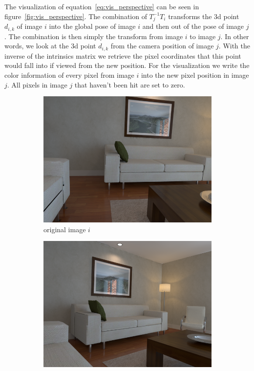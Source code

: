         The visualization of equation~\ref{eq:vis_perspective} can be seen in figure~\ref{fig:vis_perspective}.
        The combination of $T_j^{-1}T_i$ transforms the 3d point $d_{i,k}$ of image $i$ into the global pose of image $i$ and then out of the pose of image $j$.
        The combination is then simply the transform from image $i$ to image $j$.
        In other words, we look at the 3d point $d_{i,k}$ from the camera position of image $j$.
        With the inverse of the intrinsics matrix we retrieve the pixel coordinates that this point would fall into if viewed from the new position.
        For the visualization we write the color information of every pixel from image $i$ into the new pixel position in image $j$.
        All pixels in image $j$ that haven't been hit are set to zero.
        \begin{figure}[ht]
            \centering
            \begin{subfigure}[b]{.45\textwidth}
                \includegraphics[width=.95\textwidth]{images/vis_perspective_01}
                \caption{original image $i$}
                \label{sfig:i_original}
            \end{subfigure}
            \begin{subfigure}[b]{.45\textwidth}
                \includegraphics[width=.95\textwidth]{images/vis_perspective_03}

\end{subfigure}
\end{figure}
